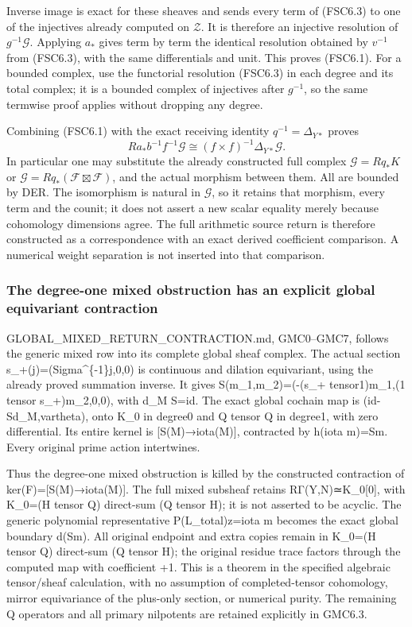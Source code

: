 Inverse image is exact for these sheaves and sends every term of
(FSC6.3) to one of the injectives already computed on \(\mathcal Z\). It
is therefore an injective resolution of \(g^{-1}\mathcal G\). Applying
\(a_*\) gives term by term the identical resolution obtained by
\(v^{-1}\) from (FSC6.3), with the same differentials and unit. This
proves (FSC6.1). For a bounded complex, use the functorial resolution
(FSC6.3) in each degree and its total complex; it is a bounded complex
of injectives after \(g^{-1}\), so the same termwise proof applies
without dropping any degree.

Combining (FSC6.1) with the exact receiving identity
\(q^{-1}=\Delta_{Y*}\) proves \[
\boxed{Ra_*b^{-1}f^{-1}\mathcal G\cong
(f\times f)^{-1}\Delta_{Y*}\mathcal G.}
\tag{FSC6.4}
\] In particular one may substitute the already constructed full complex
\(\mathcal G=Rq_*K\) or
\(\mathcal G=Rq_*(\mathcal F\boxtimes\mathcal F)\), and the actual
morphism between them. All are bounded by DER. The isomorphism is
natural in \(\mathcal G\), so it retains that morphism, every term and
the counit; it does not assert a new scalar equality merely because
cohomology dimensions agree. The full arithmetic source return is
therefore constructed as a correspondence with an exact derived
coefficient comparison. A numerical weight separation is not inserted
into that comparison.

\subsubsection{The degree-one mixed obstruction has an explicit global
equivariant
contraction}\label{the-degree-one-mixed-obstruction-has-an-explicit-global-equivariant-contraction}

GLOBAL\_MIXED\_RETURN\_CONTRACTION.md, GMC0--GMC7, follows the generic
mixed row into its complete global sheaf complex. The actual section
s\_+(j)=(Sigma\^{}\{-1\}j,0,0) is continuous and dilation equivariant,
using the already proved summation inverse. It gives
S(m\_1,m\_2)=(-(s\_+ tensor1)m\_1,(1 tensor s\_+)m\_2,0,0), with d\_M
S=id. The exact global cochain map is (id-Sd\_M,vartheta), onto K\_0 in
degree0 and Q tensor Q in degree1, with zero differential. Its entire
kernel is {[}S(M)→iota(M){]}, contracted by h(iota m)=Sm. Every original
prime action intertwines.

Thus the degree-one mixed obstruction is killed by the constructed
contraction of ker(F)={[}S(M)→iota(M){]}. The full mixed subsheaf
retains RΓ(Y,N)≃K\_0{[}0{]}, with K\_0=(H tensor Q) direct-sum (Q tensor
H); it is not asserted to be acyclic. The generic polynomial
representative P(L\_total)z=iota m becomes the exact global boundary
d(Sm). All original endpoint and extra copies remain in K\_0=(H tensor
Q) direct-sum (Q tensor H); the original residue trace factors through
the computed map with coefficient +1. This is a theorem in the specified
algebraic tensor/sheaf calculation, with no assumption of
completed-tensor cohomology, mirror equivariance of the plus-only
section, or numerical purity. The remaining Q operators and all primary
nilpotents are retained explicitly in GMC6.3.

